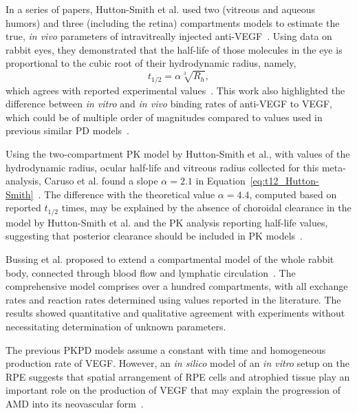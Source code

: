 \documentclass[12pt,a4paper]{journal}
\begin{document}
In a series of papers, Hutton-Smith et al. used two (vitreous and aqueous humors) and three (including the retina) compartments models to estimate the true, \textit{in vivo} parameters of intravitreally injected anti-VEGF~\cite{HuttonSmith_2016,HuttonSmith_2017,HuttonSmith_2018}.
Using data on rabbit eyes, they demonstrated that the half-life of those molecules in the eye is proportional to the cubic root of their hydrodynamic radius, namely,
\begin{equation}
  \label{eq:t12_Hutton-Smith}
  t_{1/2} = \alpha\sqrt[3]{R_h},
\end{equation}
which agrees with reported experimental values~\cite{HuttonSmith_2016}.
This work also highlighted the difference between \textit{in vitro} and \textit{in vivo} binding rates of anti-VEGF to VEGF, which could be of multiple order of magnitudes compared to values used in previous similar PD models~\cite{Saunders_2015}.

Using the two-compartment PK model by Hutton-Smith et al., with values of the hydrodynamic radius, ocular half-life and vitreous radius collected for this meta-analysis, Caruso et al. found a slope $\alpha=2.1$ in Equation~\ref{eq:t12_Hutton-Smith}~\cite{Caruso_2020}.
The difference with the theoretical value $\alpha=4.4$, computed based on reported $t_{1/2}$ times, may be explained by the absence of choroidal clearance in the model by Hutton-Smith et al. and the PK analysis reporting half-life values, suggesting that posterior clearance should be included in PK models~\cite{HuttonSmith_2016}.

Bussing et al. proposed to extend a compartmental model of the whole rabbit body, connected through blood flow and lymphatic circulation~\cite{Bussing_2020}.
The comprehensive model comprises over a hundred compartments, with all exchange rates and reaction rates determined using values reported in the literature.
The results showed quantitative and qualitative agreement with experiments without necessitating determination of unknown parameters. 

The previous PKPD models assume a constant with time and homogeneous production rate of VEGF.
However, an \textit{in silico} model of an \textit{in vitro} setup on the RPE suggests that spatial arrangement of RPE cells and atrophied tissue play an important role on the production of VEGF that may explain the progression of AMD into its neovascular form~\cite{Baker_2017}.  
\end{document}

